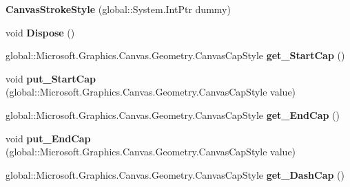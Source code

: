\begin{DoxyCompactItemize}
{\bfseries Canvas\+Stroke\+Style} (global\+::\+System.\+Int\+Ptr dummy)
\item 
\mbox{\label{class_microsoft_1_1_graphics_1_1_canvas_1_1_geometry_1_1_canvas_stroke_style_ad363b1ddc2f498a833220cbfda7cee42}} 
void {\bfseries Dispose} ()
\item 
\mbox{\label{class_microsoft_1_1_graphics_1_1_canvas_1_1_geometry_1_1_canvas_stroke_style_ad88c6468f388b2eb08a9719477f05865}} 
global\+::\+Microsoft.\+Graphics.\+Canvas.\+Geometry.\+Canvas\+Cap\+Style {\bfseries get\+\_\+\+Start\+Cap} ()
\item 
\mbox{\label{class_microsoft_1_1_graphics_1_1_canvas_1_1_geometry_1_1_canvas_stroke_style_a7d8f82f4ff8e2d65759fc7359e698584}} 
void {\bfseries put\+\_\+\+Start\+Cap} (global\+::\+Microsoft.\+Graphics.\+Canvas.\+Geometry.\+Canvas\+Cap\+Style value)
\item 
\mbox{\label{class_microsoft_1_1_graphics_1_1_canvas_1_1_geometry_1_1_canvas_stroke_style_ab89db4f7c48a94cfd80ea551415cd2f0}} 
global\+::\+Microsoft.\+Graphics.\+Canvas.\+Geometry.\+Canvas\+Cap\+Style {\bfseries get\+\_\+\+End\+Cap} ()
\item 
\mbox{\label{class_microsoft_1_1_graphics_1_1_canvas_1_1_geometry_1_1_canvas_stroke_style_a7b6afd8e63542d3d893b8ba1dba200df}} 
void {\bfseries put\+\_\+\+End\+Cap} (global\+::\+Microsoft.\+Graphics.\+Canvas.\+Geometry.\+Canvas\+Cap\+Style value)
\item 
\mbox{\label{class_microsoft_1_1_graphics_1_1_canvas_1_1_geometry_1_1_canvas_stroke_style_a4ed5fa2a457de0566e9deccd86297f66}} 
global\+::\+Microsoft.\+Graphics.\+Canvas.\+Geometry.\+Canvas\+Cap\+Style {\bfseries get\+\_\+\+Dash\+Cap} ()
\item 
\mbox{\label{class_microsoft_1_1_graphics_1_1_canvas_1_1_geometry_1_1_canvas_stroke_style_af6dd55589d9a2841f19982e1102a37a3}} 

\end{DoxyCompactItemize}
